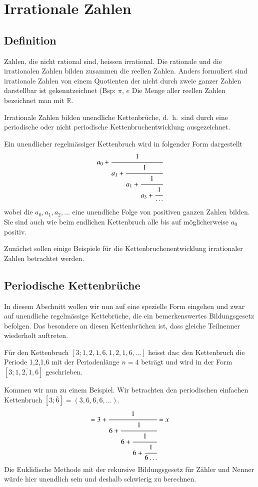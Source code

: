 %
%
%
\section{Irrationale Zahlen
\label{kettenbruch:section:Irrationale Zahlen}}
\subsection{Definition}
Zahlen, die nicht rational sind, heissen irrational. Die rationale
und die irrationalen Zahlen bilden zusammen die reellen Zahlen.
Anders formuliert sind irrationale Zahlen von einem Quotienten der
nicht durch zweie ganzer Zahlen darstellbar ist gekenntzeichnet
(Bsp:  $\pi$, $e$
Die Menge aller reellen Zahlen bezeichnet man mit $\mathbb{R}$.

Irrationale Zahlen bilden unendliche Kettenbrüche, d.~h.~sind durch
eine periodische oder nicht periodische Kettenbruchentwicklung
ausgezeichnet.

Ein unendlicher regelmässiger Kettenbruch wird in folgender Form dargestellt
\begin{equation}
a_0 + \cfrac{1}{a_1+\cfrac{1}{a_1+\cfrac{1}{a_3+\cfrac{1}{\cdots}}}}
\end{equation}
wobei die $a_0,a_1,a_2,\dots$ eine unendliche Folge von positiven
ganzen Zahlen bilden. Sie sind auch wie beim endlichen Kettenbruch
alle bis auf möglicherweise $a_0$ positiv.

Zunächst sollen einige Beispiele für die Kettenbruchenentwicklung
irrationaler Zahlen betrachtet werden.

\subsection{Periodische Kettenbrüche}
In diesem Abschnitt wollen wir nun auf eine spezielle Form eingehen
und zwar auf unendliche regelmässige Kettebrüche, die ein bemerkenswertes
Bildungsgesetz befolgen. Das besondere an diesen Kettenbrüchen ist,
dass gleiche Teilnenner wiederholt auftreten.

Für den Kettenbruch $[3;1,2,1,6,1,2,1,6,\dots]$ heisst das: den
Kettenbruch die Periode 1,2,1,6 mit der Periodenlänge $n=4$ beträgt
und wird in der Form $[3;\overline{1,2,1,6}]$ geschrieben.

Kommen wir nun zu einem Beispiel. Wir betrachten den periodischen
einfachen Kettenbruch $[3;\bar{6}] = (3,6,6,6,\dots)$.
\begin{equation}
[3;\bar{6}]
=
3 + \cfrac{1}{6+\cfrac{1}{6+\cfrac{1}{6+\cfrac{1}{6\dots}}}}
=
x
\end{equation}
Die Euklidische Methode mit der rekursive Bildungsgesetz für Zähler
und Nenner würde hier unendlich sein und deshalb schwierig zu
berechnen.

